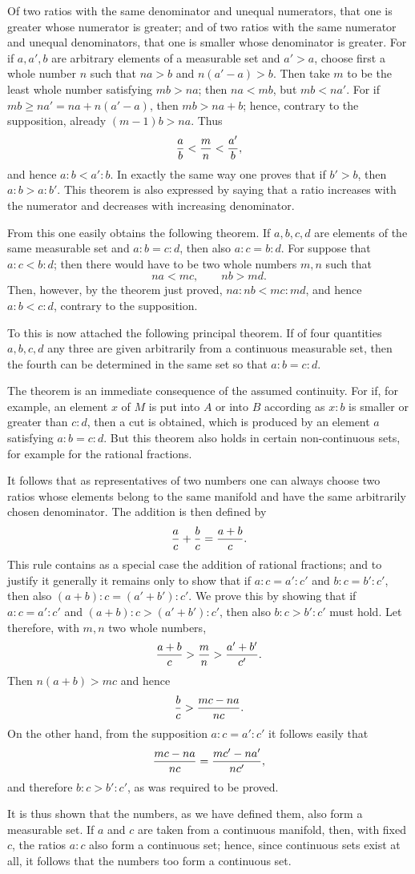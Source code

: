 \documentclass[11pt]{article}
\begin{document}
Of two ratios with the same denominator and unequal numerators, that one is greater whose numerator is greater; and of two ratios with the same numerator and unequal denominators, that one is smaller whose denominator is greater. For if $a,a',b$ are arbitrary elements of a measurable set and $a'>a$, choose first a whole number $n$ such that $na>b$ and $n(a'-a)>b$. Then take $m$ to be the least whole number satisfying $mb>na$; then $na<mb$, but $mb<na'$. For if $mb\ge na'=na+n(a'-a)$, then $mb>na+b$; hence, contrary to the supposition, already $(m-1)b>na$. Thus
\[
 {a\over b}<{m\over n}<{a'
\over b},
\]
and hence $a:b<a':b$. In exactly the same way one proves that if $b'>b$, then $a:b>a:b'$. This theorem is also expressed by saying that a ratio increases with the numerator and decreases with increasing denominator.

From this one easily obtains the following theorem. If $a,b,c,d$ are elements of the same measurable set and $a:b=c:d$, then also $a:c=b:d$. For suppose that $a:c<b:d$; then there would have to be two whole numbers $m,n$ such that
\[
 na<mc,
 \qquad nb>md.
\]
Then, however, by the theorem just proved, $na:nb<mc:md$, and hence $a:b<c:d$, contrary to the supposition.

To this is now attached the following principal theorem. If of four quantities $a,b,c,d$ any three are given arbitrarily from a continuous measurable set, then the fourth can be determined in the same set so that $a:b=c:d$.

The theorem is an immediate consequence of the assumed continuity. For if, for example, an element $x$ of $M$ is put into $A$ or into $B$ according as $x:b$ is smaller or greater than $c:d$, then a cut is obtained, which is produced by an element $a$ satisfying $a:b=c:d$. But this theorem also holds in certain non-continuous sets, for example for the rational fractions.

It follows that as representatives of two numbers one can always choose two ratios whose elements belong to the same manifold and have the same arbitrarily chosen denominator. The addition is then defined by
\[
 {a\over c}+{b\over c}={a+b\over c}.
\]
This rule contains as a special case the addition of rational fractions; and to justify it generally it remains only to show that if $a:c=a':c'$ and $b:c=b':c'$, then also $(a+b):c=(a'+b'):c'$. We prove this by showing that if $a:c=a':c'$ and $(a+b):c>(a'+b'):c'$, then also $b:c>b':c'$ must hold. Let therefore, with $m,n$ two whole numbers,
\[
 {a+b\over c}>{m\over n}>{a'+b'
\over c'}.
\]
Then $n(a+b)>mc$ and hence
\[
 {b\over c}>{mc-na\over nc}.
\]
On the other hand, from the supposition $a:c=a':c'$ it follows easily that
\[
 {mc-na\over nc}={mc'-na'\over nc'},
\]
and therefore $b:c>b':c'$, as was required to be proved.

It is thus shown that the numbers, as we have defined them, also form a measurable set. If $a$ and $c$ are taken from a continuous manifold, then, with fixed $c$, the ratios $a:c$ also form a continuous set; hence, since continuous sets exist at all, it follows that the numbers too form a continuous set.
\end{document}
